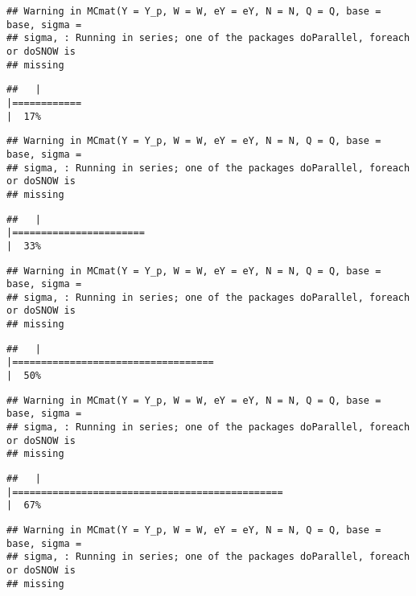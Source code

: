 \documentclass[]{article}
\begin{document}
\begin{verbatim}
## Warning in MCmat(Y = Y_p, W = W, eY = eY, N = N, Q = Q, base = base, sigma =
## sigma, : Running in series; one of the packages doParallel, foreach or doSNOW is
## missing
\end{verbatim}

\begin{verbatim}
##   |                                                                              |============                                                          |  17%
\end{verbatim}

\begin{verbatim}
## Warning in MCmat(Y = Y_p, W = W, eY = eY, N = N, Q = Q, base = base, sigma =
## sigma, : Running in series; one of the packages doParallel, foreach or doSNOW is
## missing
\end{verbatim}

\begin{verbatim}
##   |                                                                              |=======================                                               |  33%
\end{verbatim}

\begin{verbatim}
## Warning in MCmat(Y = Y_p, W = W, eY = eY, N = N, Q = Q, base = base, sigma =
## sigma, : Running in series; one of the packages doParallel, foreach or doSNOW is
## missing
\end{verbatim}

\begin{verbatim}
##   |                                                                              |===================================                                   |  50%
\end{verbatim}

\begin{verbatim}
## Warning in MCmat(Y = Y_p, W = W, eY = eY, N = N, Q = Q, base = base, sigma =
## sigma, : Running in series; one of the packages doParallel, foreach or doSNOW is
## missing
\end{verbatim}

\begin{verbatim}
##   |                                                                              |===============================================                       |  67%
\end{verbatim}

\begin{verbatim}
## Warning in MCmat(Y = Y_p, W = W, eY = eY, N = N, Q = Q, base = base, sigma =
## sigma, : Running in series; one of the packages doParallel, foreach or doSNOW is
## missing
\end{verbatim}
\end{document}
